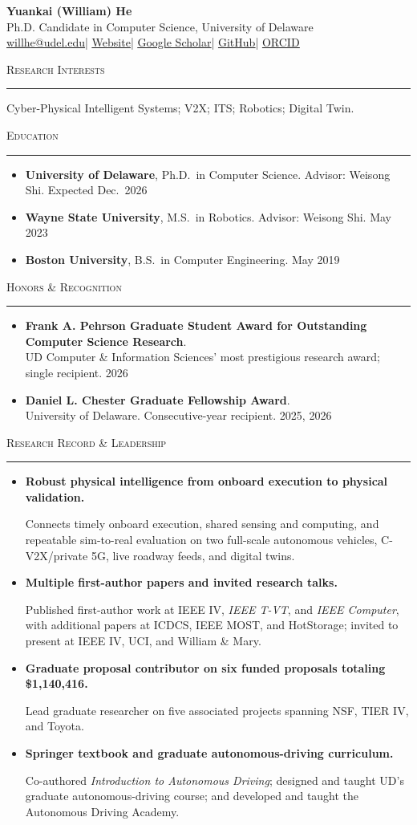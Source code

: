 \documentclass[11pt]{article}
\let\cvplainhref\href
\renewcommand{\href}[2]{\cvplainhref{#1}{\uline{#2}}}
\newcommand{\cvsection}[1]{%
  \Needspace{5\baselineskip}%
  \vspace{0.62em}%
  {\large\scshape #1}\par
  \vspace{0.12em}\hrule\vspace{0.32em}
}
\newcommand{\contactsep}{\enspace | \enspace}
\newcommand{\cvleaditem}[2]{%
  \Needspace{4\baselineskip}%
  \item \textbf{#1}\par
  \vspace{0.03em}%
  #2%
}
\begin{document}
\begin{center}
{\LARGE \textbf{Yuankai (William) He}}\\[0.3em]
Ph.D. Candidate in Computer Science, University of Delaware\\[0.3em]
\href{mailto:willhe@udel.edu}{willhe@udel.edu}\contactsep
\href{https://croquembouche.github.io/williamhe/}{Website}\contactsep
\href{https://scholar.google.com/citations?user=mBSNk3UAAAAJ&hl=en&oi=ao}{Google Scholar}\contactsep
\href{https://github.com/Croquembouche}{GitHub}\contactsep
\href{https://orcid.org/0000-0002-8793-9939}{ORCID}
\end{center}

\cvsection{Research Interests}
Cyber-Physical Intelligent Systems; V2X; ITS; Robotics; Digital Twin.

\cvsection{Education}
\begin{itemize}
    \item \textbf{University of Delaware}, Ph.D.\ in Computer Science. Advisor: Weisong Shi. \hfill Expected Dec.\ 2026
    \item \textbf{Wayne State University}, M.S.\ in Robotics. Advisor: Weisong Shi. \hfill May 2023
    \item \textbf{Boston University}, B.S.\ in Computer Engineering. \hfill May 2019
\end{itemize}

\cvsection{Honors \& Recognition}
\begin{itemize}
    \item \textbf{Frank A. Pehrson Graduate Student Award for Outstanding Computer Science Research}.\\
    UD Computer \& Information Sciences' most prestigious research award; single recipient. \hfill 2026
    \item \textbf{Daniel L. Chester Graduate Fellowship Award}.\\
    University of Delaware. Consecutive-year recipient. \hfill 2025, 2026
\end{itemize}

\cvsection{Research Record \& Leadership}
\begin{itemize}
    \cvleaditem{Robust physical intelligence from onboard execution to physical validation.}{Connects timely onboard execution, shared sensing and computing, and repeatable sim-to-real evaluation on two full-scale autonomous vehicles, C-V2X/private 5G, live roadway feeds, and digital twins.}
    \cvleaditem{Multiple first-author papers and invited research talks.}{Published first-author work at IEEE IV, \textit{IEEE T-VT}, and \textit{IEEE Computer}, with additional papers at ICDCS, IEEE MOST, and HotStorage; invited to present at IEEE IV, UCI, and William \& Mary.}
    \cvleaditem{Graduate proposal contributor on six funded proposals totaling \$1{,}140{,}416.}{Lead graduate researcher on five associated projects spanning NSF, TIER IV, and Toyota.}
    \cvleaditem{Springer textbook and graduate autonomous-driving curriculum.}{Co-authored \textit{Introduction to Autonomous Driving}; designed and taught UD's graduate autonomous-driving course; and developed and taught the Autonomous Driving Academy.}
\end{itemize}
\end{document}
